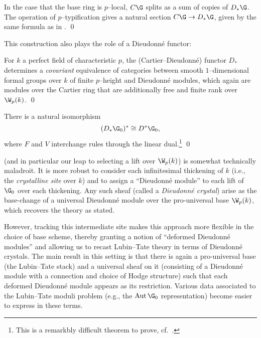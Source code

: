 \begin{lemma}
In the case that the base ring is \(p\)--local, \(C\G\) splits as a sum of copies of \(D_* \G\).  The operation of \(p\)--typification gives a natural section \(C\G \to D_* \G\), given by the same formula as in . \qed
\end{lemma}

This construction also plays the role of a Dieudonn\'e functor:

\begin{theorem}\label{CurveDieudonneTheorem}
For \(k\) a perfect field of characteristic \(p\), the (Cartier--Dieudonn\'e) functor \(D_*\) determines a \emph{covariant} equivalence of categories between smooth \(1\)--dimensional formal groups over \(k\) of finite \(p\)--height and Dieudonn\'e modules, which again are modules over the Cartier ring that are additionally free and finite rank over \(\W_p(k)\). \qed
\end{theorem}

\begin{theorem}\label{DieudonneDualityThm}
There is a natural isomorphism \[(D_* \G_0)^* \cong D^* \G_0,\] where \(F\) and \(V\) interchange rules through the linear dual.\footnote{This is a remarkbly difficult theorem to prove, cf.\ .} \pushQED\qed\qedhere\popQED
\end{theorem}

\begin{remark}
 (and in particular our leap to selecting a lift over \(\W_p(k)\)) is somewhat technically maladroit.  It is more robust to consider each infinitesimal thickening of \(k\) (i.e., the \textit{crystalline site} over \(k\)) and to assign a ``Dieudonn\'e module'' to each lift of \(\G_0\) over each thickening.  Any such sheaf (called a \textit{Dieudonn\'e crystal}) arise as the base-change of a universal Dieudonn\'e module over the pro-universal base \(\W_p(k)\), which recovers the theory as stated.

However, tracking this intermediate site makes this approach more flexible in the choice of base scheme, thereby granting a notion of ``deformed Dieudonn\'e modules'' and allowing us to recast Lubin--Tate theory in terms of Dieudonn\'e crystals.  The main result in this setting is that there is again a pro-universal base (the Lubin--Tate stack) and a universal sheaf on it (consisting of a Dieudonn\'e module with a connection and choice of Hodge structure) such that each deformed Dieudonn\'e module appears as its restriction.  Various data associated to the Lubin--Tate moduli problem (e.g., the \(\Aut \G_0\) representation) become easier to express in these terms.
\end{remark}

